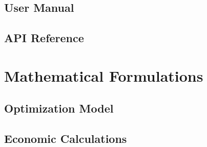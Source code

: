 \documentclass{article}
\begin{document}
\subsection{User Manual}
\subsection{API Reference}

\section{Mathematical Formulations}
\subsection{Optimization Model}
\subsection{Economic Calculations}



\end{document}
